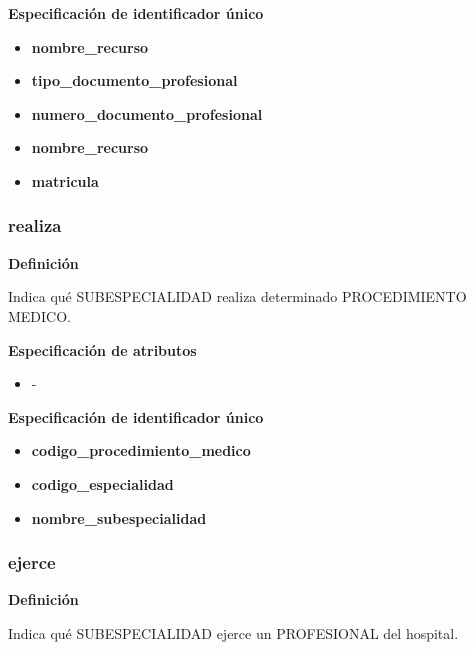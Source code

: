 \documentclass[a4paper,11pt]{article}
\begin{document}
\textbf{Especificación de identificador único}

\begin{itemize}

    \item \textbf{nombre\_recurso}
   
    \item \textbf{tipo\_documento\_profesional}
    
    \item \textbf{numero\_documento\_profesional}	 
   	 
    \item \textbf{nombre\_recurso}
   
    \item \textbf{matricula}

\end{itemize}

\subsubsection{\textbf{realiza}}

\textbf{Definición}

Indica qué SUBESPECIALIDAD realiza determinado PROCEDIMIENTO MEDICO.

\textbf{Especificación de atributos}

\begin{itemize}
\item -
\end{itemize}

\textbf{Especificación de identificador único}

\begin{itemize}

    \item \textbf{codigo\_procedimiento\_medico}
   
    \item \textbf{codigo\_especialidad}
   
    \item \textbf{nombre\_subespecialidad}

\end{itemize}

\subsubsection{\textbf{ejerce}}

\textbf{Definición}

Indica qué SUBESPECIALIDAD ejerce un PROFESIONAL del hospital.
\end{document}
